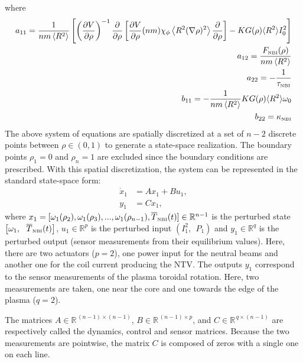 \documentclass[12pt]{iopart}
\begin{document}
 where
 \begin{eqnarray}
 a_{11} =  \frac{1}{n m \left<R^2\right>} \left[ \left( \frac{\partial V}{\partial\rho}\right)^{-1}
   \frac{\partial}{\partial \rho} 
   \left[\frac{\partial V}{\partial \rho}(n m)\chi_\phi 
   \left< R^2 (\nabla \rho)^2\right> 
   \frac{\partial}{\partial\rho}\right]-K G(\rho) \langle R^2 \rangle  I^2_0 \right]  \nonumber \\
 a_{12} =  \frac{ F_\textrm{\tiny{NBI}}(\rho) }{n m \left<R^2\right>}\nonumber \\
 a_{22} = - \frac{1}{\tau_\textrm{\tiny{NBI}}}  \nonumber \\  
 b_{11} = - \frac{1}{n m \left<R^2\right>} K G(\rho) \langle R^2 \rangle  \omega_0 \nonumber \\
 b_{22} = \kappa_\textrm{\tiny{NBI}} \nonumber
 \end{eqnarray}
 The above system of equations are spatially discretized at a set of $n-2$ discrete points between $\rho \in (0,1)$ to generate a state-space realization. The boundary points $\rho_1 = 0$ and $\rho_n =1$ are excluded since the boundary conditions are prescribed. With this spatial discretization, the system can be represented in the standard state-space form:
\begin{eqnarray}
 \dot{x}_1 &= A x_1 + B u_{1} ,\label{eqn:state-space1} \\
 y_1 &= C x_1, \label{eqn:state-space2} 
\end{eqnarray}
where $x_1 = [  \omega_1(\rho_2),  \omega_1(\rho_3), ...,   \omega_1(\rho_{n-1}), \overline{T}_\textrm{\tiny{NBI}}(t)     ] \in \mathbb{R}^{n-1}$ is the perturbed state $  \left[ \omega_1 , \ \ \overline{T}_\textrm{\tiny{NBI}}(t)  \right]$, $u_1 \in \mathbb{R}^p$ is the perturbed input $\left( I^2_1, \ \  P_1 \right)$ and $y_1 \in \mathbb{R}^q$ is the perturbed output (sensor measurements from their equilibrium values).
Here, there are two actuators ($p=2$), one power input for the neutral beams and another one for the coil current producing the NTV.
The outputs $y_1$ correspond to the sensor measurements of the plasma toroidal rotation. Here, two measurements are taken, one near the core and one towards the edge of the plasma ($q=2$).

The matrices $A \in \mathbb{R}^{\, (n-1) \times (n-1)}$, $B \in \mathbb{R}^{\,(n-1) \times p}$, and $C \in \mathbb{R}^{\, q \times (n-1)}$ are respectively called the dynamics, control and sensor matrices.
Because the two measurements are pointwise, the matrix $C$ is composed of zeros with a single one on each line.
\end{document}
